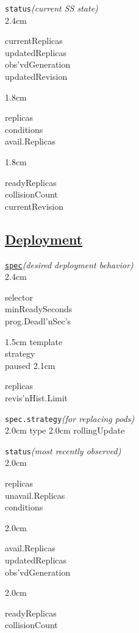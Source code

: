 \texttt{status}\quad\textit{(current SS state)}\\[-2mm]
\api
{2.4cm}{
currentReplicas \\
updatedReplicas \\
obs'vdGeneration    \\
updatedRevision

}
{1.8cm}{
replicas        \\
conditions      \\
avail.Replicas

}
{1.8cm}{
readyReplicas   \\
collisionCount  \\
currentRevision

}
\stopapi


\subsection*{\href{https://kubernetes.io/docs/concepts/workloads/controllers/deployment/}{Deployment}}


\texttt{\href{https://kubernetes.io/docs/reference/kubernetes-api/workload-resources/deployment-v1/}{spec}}\quad\textit{(desired deployment behavior)}\\[-2mm]
\api
{2.4cm}{
selector        \\
minReadySeconds \\
prog.Deadl'nSec's

}
{1.5cm}{
template        \\
strategy        \\
paused
}
{2.1cm}{
replicas        \\
revis'nHist.Limit

}
\stopapi

\texttt{spec.strategy}\quad\textit{(for replacing pods)}\\[-2mm]
\api
{2.0cm}{
type
}
{2.0cm}{
rollingUpdate
}
\stopapi


\texttt{status}\quad\textit{(most recently observed)}\\[-2mm]
\api
{2.0cm}{
replicas        \\
unavail.Replicas\\
conditions      

}
{2.0cm}{
avail.Replicas  \\
updatedReplicas \\
obs'vdGeneration

}
{2.0cm}{
readyReplicas   \\
collisionCount  

}
\stopapi







